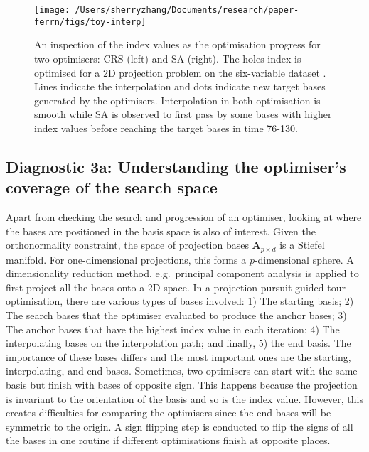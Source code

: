 \begin{Schunk}
\begin{figure}

{\centering \texttt{[image: /Users/sherryzhang/Documents/research/paper-ferrn/figs/toy-interp]} 

}

\caption[An inspection of the index values as the optimisation progress for two optimisers]{An inspection of the index values as the optimisation progress for two optimisers: CRS (left) and SA (right). The holes index is optimised for a 2D projection problem on the six-variable dataset . Lines indicate the interpolation and dots indicate new target bases generated by the optimisers. Interpolation in both optimisation is smooth while SA is observed to first pass by some bases with higher index values before reaching the target bases in time 76-130.}\label{fig:toy-interp}
\end{figure}
\end{Schunk}

\hypertarget{toy-pca}{%
\subsection{Diagnostic 3a: Understanding the optimiser's coverage of the
search space}\label{toy-pca}}

Apart from checking the search and progression of an optimiser, looking
at where the bases are positioned in the basis space is also of
interest. Given the orthonormality constraint, the space of projection
bases \(\mathbf{A}_{p \times d}\) is a Stiefel manifold. For
one-dimensional projections, this forms a \(p\)-dimensional sphere. A
dimensionality reduction method, e.g.~principal component analysis is
applied to first project all the bases onto a 2D space. In a projection
pursuit guided tour optimisation, there are various types of bases
involved: 1) The starting basis; 2) The search bases that the optimiser
evaluated to produce the anchor bases; 3) The anchor bases that have the
highest index value in each iteration; 4) The interpolating bases on the
interpolation path; and finally, 5) the end basis. The importance of
these bases differs and the most important ones are the starting,
interpolating, and end bases. Sometimes, two optimisers can start with
the same basis but finish with bases of opposite sign. This happens
because the projection is invariant to the orientation of the basis and
so is the index value. However, this creates difficulties for comparing
the optimisers since the end bases will be symmetric to the origin. A
sign flipping step is conducted to flip the signs of all the bases in
one routine if different optimisations finish at opposite places.

